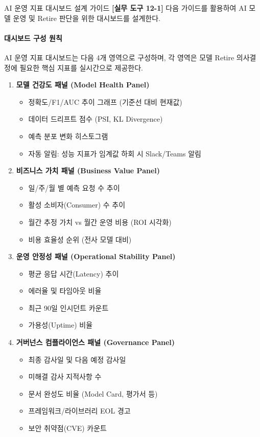 \begin{practicaltool}{AI 운영 지표 대시보드 설계 가이드}
\textbf{[실무 도구 12-1]} 다음 가이드를 활용하여 AI 모델 운영 및 Retire 판단을 위한 대시보드를 설계한다.

\paragraph{대시보드 구성 원칙}
AI 운영 지표 대시보드는 다음 4개 영역으로 구성하며, 각 영역은 모델 Retire 의사결정에 필요한 핵심 지표를 실시간으로 제공한다.

\begin{enumerate}
 \item \textbf{모델 건강도 패널 (Model Health Panel)}
 \begin{itemize}
  \item 정확도/F1/AUC 추이 그래프 (기준선 대비 현재값)
  \item 데이터 드리프트 점수 (PSI, KL Divergence)
  \item 예측 분포 변화 히스토그램
  \item 자동 알림: 성능 지표가 임계값 하회 시 Slack/Teams 알림
 \end{itemize}

 \item \textbf{비즈니스 가치 패널 (Business Value Panel)}
 \begin{itemize}
  \item 일/주/월 별 예측 요청 수 추이
  \item 활성 소비자(Consumer) 수 추이
  \item 월간 추정 가치 vs 월간 운영 비용 (ROI 시각화)
  \item 비용 효율성 순위 (전사 모델 대비)
 \end{itemize}

 \item \textbf{운영 안정성 패널 (Operational Stability Panel)}
 \begin{itemize}
  \item 평균 응답 시간(Latency) 추이
  \item 에러율 및 타임아웃 비율
  \item 최근 90일 인시던트 카운트
  \item 가용성(Uptime) 비율
 \end{itemize}

 \item \textbf{거버넌스 컴플라이언스 패널 (Governance Panel)}
 \begin{itemize}
  \item 최종 감사일 및 다음 예정 감사일
  \item 미해결 감사 지적사항 수
  \item 문서 완성도 비율 (Model Card, 평가서 등)
  \item 프레임워크/라이브러리 EOL 경고
  \item 보안 취약점(CVE) 카운트
 \end{itemize}
\end{enumerate}


\end{practicaltool}

